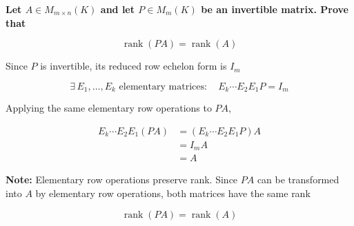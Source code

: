 \item \textbf{Let $A\in M_{m\times n}(K)$
and let $P\in M_m(K)$ be an invertible matrix.
Prove that}

$$
\operatorname{rank}(PA)=\operatorname{rank}(A)
$$


\begin{answer}
    Since $P$ is invertible, its reduced
    row echelon form is $I_m$

    $$
    \exists\,E_1,\ldots,E_k
    \text{ elementary matrices}:
    \quad
    E_k\cdots E_2E_1P=I_m
    $$

    Applying the same elementary row
    operations to $PA$,

    $$
    \begin{aligned}
    E_k\cdots E_2E_1(PA)
    &=(E_k\cdots E_2E_1P)A\\
    &=I_mA\\
    &=A
    \end{aligned}
    $$

    {\color{red}
    \textbf{Note:} Elementary row operations
    preserve rank. Since $PA$ can be
    transformed into $A$ by elementary
    row operations, both matrices have
    the same rank
    }

    $$
    \boxed{
    \operatorname{rank}(PA)=\operatorname{rank}(A)
    }
    $$
\end{answer}
